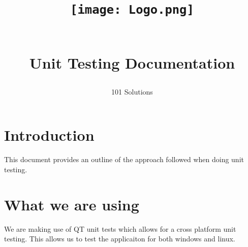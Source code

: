 \documentclass[a4paper,12pt,final]{article}
\title{
\begin{center}
  	\texttt{[image: Logo.png]} 
  \end{center}
  \textbf{\\}
Unit Testing Documentation\\
}
\author{101 Solutions}
\begin{document}
\maketitle
\thispagestyle{empty}
\newpage
\tableofcontents
\thispagestyle{empty}
\newpage
{}

\section{Introduction}
This document provides an outline of the approach followed when doing unit testing.

\section{What we are using}
We are making use of QT unit tests which allows for a cross platform unit testing. This allows us to test the applicaiton for both windows and linux.
\end{document}
